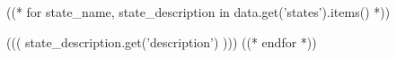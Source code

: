 \begin{multicols}{3}
    \begin{description}[Fortran]
    \ifdefined\tightlist\tightlist\fi%
    ((* for state_name, state_description in data.get('states').items() *))
    \item[\((( state_name )))] ((( state_description.get('description') )))
    ((* endfor *))
    \end{description}
\end{multicols}